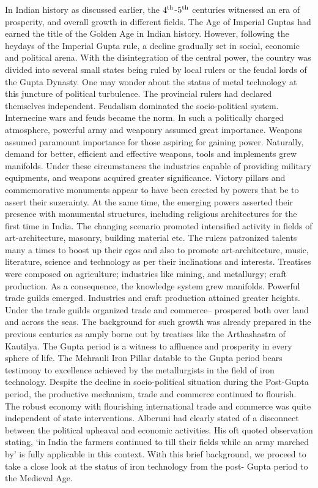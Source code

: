In Indian history as discussed earlier, the $4^{\rm th}$-$5^{\rm th}$ centuries witnessed an era of prosperity, and overall growth in different fields. The Age of Imperial Guptas had earned the title of the Golden Age in Indian history. However, following the heydays of the Imperial Gupta rule, a decline gradually set in social, economic and political arena. With the disintegration of the central power, the country was divided into several small states being ruled by local rulers or the feudal lords of the Gupta Dynasty. One may wonder about the status of metal technology at this juncture of political turbulence. The provincial rulers had declared themselves independent. Feudalism dominated the socio-political system.  Internecine wars and feuds became the norm. In such a politically charged atmosphere, powerful army and weaponry assumed great importance. Weapons assumed paramount importance for those aspiring for gaining power. Naturally, demand for better, efficient and effective weapons, tools and implements grew manifolds. Under these circumstances the industries capable of providing military equipments, and weapons acquired greater significance. Victory pillars and commemorative monuments appear to have been erected by powers that be to assert their suzerainty. At the same time, the emerging powers asserted their presence with monumental structures, including religious architectures for the first time in India. The changing scenario promoted intensified activity in fields of art-architecture, masonry, building material etc. The rulers patronized talents many a times to boost up their egos and also to promote art-architecture, music, literature, science and technology as per their inclinations and interests. Treatises were composed on agriculture; industries like mining, and metallurgy; craft production. As a consequence, the knowledge system grew manifolds. Powerful trade guilds emerged. Industries and craft production attained greater heights. Under the trade guilds organized trade and commerce– prospered both over land and across the seas. The background for such growth was already prepared in the previous centuries as amply borne out by treatises like the Arthashastra of Kautilya. The Gupta period is a witness to affluence and prosperity in every sphere of life. The Mehrauli Iron Pillar datable to the Gupta period bears testimony to excellence achieved by the metallurgists in the field of iron technology.  Despite the decline in socio-political situation during the Post-Gupta period, the productive mechanism, trade and commerce continued to flourish. The robust economy with flourishing international trade and commerce was quite independent of state interventions. Alberuni had clearly stated of a disconnect between the political upheaval and economic activities. His oft quoted observation stating, ‘in India the farmers continued to till their fields while an army marched by’ is fully applicable in this context. With this brief background, we proceed to take a close look at the status of iron technology from the post- Gupta period to the Medieval Age. 

